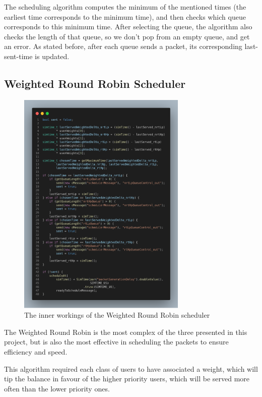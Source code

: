 \documentclass[12pt]{article}
\begin{document}
        The scheduling algorithm computes the minimum of the mentioned times (the earliest time corresponds to the minimum time), and then checks which queue corresponds to this minimum time. After selecting the queue, the algorithm also checks the length of that queue, so we don't pop from an empty queue, and get an error. As stated before, after each queue sends a packet, its corresponding last-sent-time is updated.

        \subsection{Weighted Round Robin Scheduler}
        \begin{figure}[htbp!]
            \centering
            \includegraphics[width=0.72\textwidth]{images/wrr_code.png}
            \caption{The inner workings of the Weighted Round Robin scheduler}
        \end{figure}

        The Weighted Round Robin is the most complex of the three presented in this project, but is also the most effective in scheduling the packets to ensure efficiency and speed.

        This algorithm required each class of users to have associated a weight, which will tip the balance in favour of the higher priority users, which will be served more often than the lower priority ones.
\end{document}
